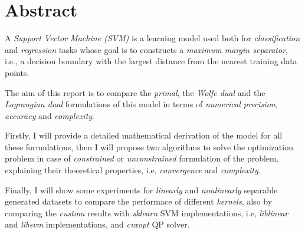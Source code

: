 \section{Abstract}

A \emph{Support Vector Machine (SVM)} is a learning model used both for \emph{classification} and \emph{regression} tasks whose goal is to constructs a \emph{maximum margin separator}, i.e., a decision boundary with the largest distance from the nearest training data points.

The aim of this report is to compare the \emph{primal}, the \emph{Wolfe dual} and the \emph{Lagrangian dual} formulations of this model in terms of \emph{numerical precision}, \emph{accuracy} and \emph{complexity}.

Firstly, I will provide a detailed mathematical derivation of the model for all these formulations, then I will propose two algorithms to solve the optimization problem in case of \emph{constrained} or \emph{unconstrained} formulation of the problem, explaining their theoretical properties, i.e, \emph{convergence} and \emph{complexity}.

Finally, I will show some experiments for \emph{linearly} and \emph{nonlinearly} separable generated datasets to compare the performace of different \emph{kernels}, also by comparing the \emph{custom} results with \emph{sklearn} SVM implementations, i.e, \emph{liblinear} and \emph{libsvm} implementations, and \emph{cvxopt} QP solver.
